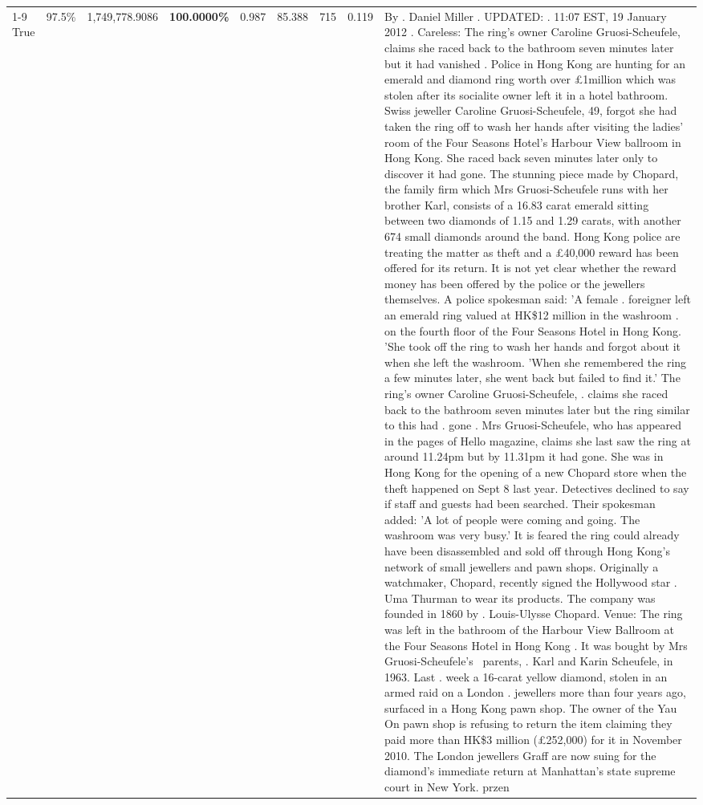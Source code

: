 \begin{table}[H]
\begin{tabular}{lllrlllll}
\cline{1-9} \cline{2-9}
True & 97.5\% & 1,749,778.9086 & \bfseries \color{red} 100.0000\% & 0.987 & 85.388 & 715 & 0.119 & By . Daniel Miller . UPDATED: . 11:07 EST, 19 January 2012 . Careless: The ring's owner Caroline Gruosi-Scheufele, claims she raced back to the bathroom seven minutes later but it had vanished . Police in Hong Kong are hunting for an emerald and diamond ring worth over £1million which was stolen after its socialite owner left it in a hotel bathroom. Swiss jeweller Caroline Gruosi-Scheufele, 49, forgot she had taken the ring off to wash her hands after visiting the ladies' room of the Four Seasons Hotel's Harbour View ballroom in Hong Kong. She raced back seven minutes later only to discover it had gone. The stunning piece made by Chopard, the family firm which Mrs Gruosi-Scheufele runs with her brother Karl, consists of a 16.83 carat emerald sitting between two diamonds of 1.15 and 1.29 carats, with another 674 small diamonds around the band. Hong Kong police are treating the matter as theft and a £40,000 reward has been offered for its return. It is not yet clear whether the reward money has been offered by the police or the jewellers themselves. A police spokesman said: 'A female . foreigner left an emerald ring valued at HK\$12 million in the washroom . on the fourth floor of the Four Seasons Hotel in Hong Kong. 'She took off the ring to wash her hands and forgot about it when she left the washroom. 'When she remembered the ring a few minutes later, she went back but failed to find it.' The ring's owner Caroline Gruosi-Scheufele, . claims she raced back to the bathroom seven minutes later but the ring similar to this had . gone . Mrs Gruosi-Scheufele, who has appeared in the pages of Hello magazine, claims she last saw the ring at around 11.24pm but by 11.31pm it had gone. She was in Hong Kong for the opening of a new Chopard store when the theft happened on Sept 8 last year. Detectives declined to say if staff and guests had been searched. Their spokesman added: 'A lot of people were coming and going. The washroom was very busy.' It is feared the ring could already have been disassembled and sold off through Hong Kong's network of small jewellers and pawn shops. Originally a watchmaker, Chopard, recently signed the Hollywood star . Uma Thurman to wear its products. The company was founded in 1860 by . Louis-Ulysse Chopard. Venue: The ring was left in the bathroom of the Harbour View Ballroom at the Four Seasons Hotel in Hong Kong . It was bought by Mrs Gruosi-Scheufele's  parents, . Karl and Karin Scheufele, in 1963. Last . week a 16-carat yellow diamond, stolen in an armed raid on a London . jewellers more than four years ago, surfaced in a Hong Kong pawn shop. The owner of the Yau On pawn shop is refusing to return the item claiming they paid more than HK\$3 million (£252,000) for it in November 2010. The London jewellers Graff are now suing for the diamond’s immediate return at Manhattan’s state supreme court in New York. przen \\

\end{tabular}
\end{table}
